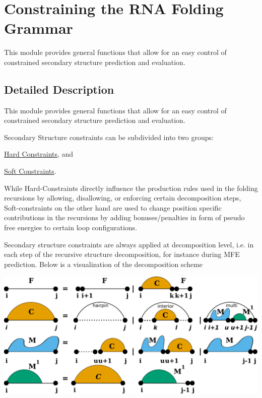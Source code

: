 \hypertarget{group__constraints}{}\section{Constraining the R\+NA Folding Grammar}
\label{group__constraints}


This module provides general functions that allow for an easy control of constrained secondary structure prediction and evaluation.  




\subsection{Detailed Description}
This module provides general functions that allow for an easy control of constrained secondary structure prediction and evaluation. 

Secondary Structure constraints can be subdivided into two groups\+:


\begin{DoxyItemize}
\item \hyperlink{group__hard__constraints}{Hard Constraints}, and
\item \hyperlink{group__soft__constraints}{Soft Constraints}.
\end{DoxyItemize}

While Hard-\/\+Constraints directly influence the production rules used in the folding recursions by allowing, disallowing, or enforcing certain decomposition steps, Soft-\/constraints on the other hand are used to change position specific contributions in the recursions by adding bonuses/penalties in form of pseudo free energies to certain loop configurations.

Secondary structure constraints are always applied at decomposition level, i.\+e. in each step of the recursive structure decomposition, for instance during M\+FE prediction. Below is a visualization of the decomposition scheme

 
\begin{DoxyImageNoCaption}
  \mbox{\includegraphics[width=\textwidth,height=\textheight/2,keepaspectratio=true]{recursions}}
\end{DoxyImageNoCaption}



